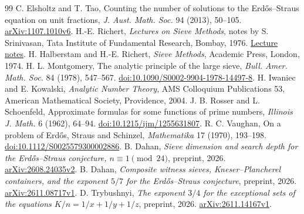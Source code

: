 \documentclass[11pt,a4paper]{amsart}
\theoremstyle{definition}\newtheorem{definition}[theorem]{Definition}
\begin{document}
\begin{thebibliography}{99}
 C. Elsholtz and T. Tao,
Counting the number of solutions to the Erd\H{o}s--Straus equation
on unit fractions, \emph{J. Aust. Math. Soc.} 94 (2013), 50--105.
\href{https://arxiv.org/abs/1107.1010v6}{arXiv:1107.1010v6}.
 H.-E. Richert,
\emph{Lectures on Sieve Methods}, notes by S. Srinivasan,
Tata Institute of Fundamental Research, Bombay, 1976.
\href{https://www.math.utoledo.edu/~codenth/Spring_13/3200/NT-books/Lectures_on_Sieve_Methods-Richert.pdf}{Lecture notes}.
 H. Halberstam and H.-E. Richert,
\emph{Sieve Methods}, Academic Press, London, 1974.
 H. L. Montgomery,
The analytic principle of the large sieve,
\emph{Bull. Amer. Math. Soc.} 84 (1978), 547--567.
\href{https://doi.org/10.1090/S0002-9904-1978-14497-8}{doi:10.1090/S0002-9904-1978-14497-8}.
 H. Iwaniec and E. Kowalski,
\emph{Analytic Number Theory}, AMS Colloquium Publications 53,
American Mathematical Society, Providence, 2004.
 J. B. Rosser and L. Schoenfeld,
Approximate formulas for some functions of prime numbers,
\emph{Illinois J. Math.} 6 (1962), 64--94.
\href{https://doi.org/10.1215/ijm/1255631807}{doi:10.1215/ijm/1255631807}.
 R. C. Vaughan,
On a problem of Erd\H{o}s, Straus and Schinzel,
\emph{Mathematika} 17 (1970), 193--198.
\href{https://doi.org/10.1112/S0025579300002886}{doi:10.1112/S0025579300002886}.
 B. Dahan,
\emph{Sieve dimension and search depth for the Erd\H{o}s--Straus
conjecture, $n\equiv1\pmod{24}$}, preprint, 2026.
\href{https://arxiv.org/abs/2608.24035v2}{arXiv:2608.24035v2}.
 B. Dahan,
\emph{Composite witness sieves, Kneser--Plancherel containers,
and the exponent $5/7$ for the Erd\H{o}s--Straus conjecture},
preprint, 2026.
\href{https://arxiv.org/abs/2611.08717v1}{arXiv:2611.08717v1}.
 D. Trybushnyi,
\emph{The exponent $3/4$ for the exceptional sets of the equations
$K/n=1/x+1/y+1/z$}, preprint, 2026.
\href{https://arxiv.org/abs/2611.14167v1}{arXiv:2611.14167v1}.
\end{thebibliography}
\end{document}

